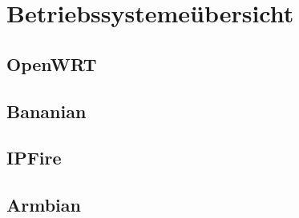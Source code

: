 \chapter{Betriebssysteme\"ubersicht}

\section{OpenWRT}

\section{Bananian}

\section{IPFire}

\section{Armbian}
